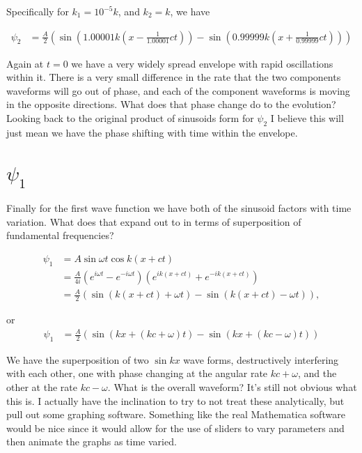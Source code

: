 Specifically for $k_1 = 10^{-5} k$, and $k_2 = k$, we have

\begin{align*}
\psi_2
&= \frac{A}{2} \left( 
\sin \left( 1.00001 k \left(x - \frac{1}{1.00001} c t\right) \right)
-\sin \left( 0.99999 k \left(x + \frac{1}{0.99999 } c t\right) \right)
\right)
\end{align*}

Again at $t=0$ we have a very widely spread envelope with rapid oscillations within it.  There is a very small difference in the rate that the two components waveforms will go out of phase, and each of the component waveforms is moving in the opposite directions.  What does that phase change do to the evolution?  Looking back to the original product of sinusoids form for $\psi_2$ I believe this will just mean we have the phase shifting with time within the envelope.

\section{$\psi_1$}

Finally for the first wave function we have both of the sinusoid factors with time variation.  What does that expand out to in terms of superposition of fundamental frequencies?

\begin{align*}
\psi_1
&= A \sin \omega t \cos k ( x + c t) \\
&= \frac{A}{4i} \left( e^{ i \omega t} - e^{ -i \omega t } \right) \left( e^{ i k ( x + c t)} + e^{ -i k ( x + c t)} \right) \\
&= \frac{A}{2} \left( 
\sin ( k (x + c t) + \omega t )
-\sin ( k (x + c t) - \omega t )
\right),
\end{align*}

or
\begin{align*}
\psi_1
&= \frac{A}{2} \left( 
\sin ( k x + ( k c + \omega ) t )
-\sin ( k x + ( k c - \omega) t )
\right)
\end{align*}

We have the superposition of two $\sin k x$ wave forms, destructively interfering with each other, one with phase changing at the angular rate $k c + \omega$, and the other at the rate $k c - \omega$.  What is the overall waveform?  It's still not obvious what this is.  I actually have the inclination to try to not treat these analytically, but pull out some graphing software.  Something like the real Mathematica software would be nice since it would allow for the use of sliders to vary parameters and then animate the graphs as time varied.

\EndArticle
